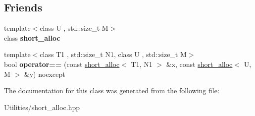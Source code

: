 \subsection*{Friends}
\begin{DoxyCompactItemize}
\item 
\hypertarget{classshort__alloc_ad683bc9e6e3661dbc2385e8fc3fb9f37}{{\footnotesize template$<$class U , std\+::size\+\_\+t M$>$ }\\class {\bfseries short\+\_\+alloc}}\label{classshort__alloc_ad683bc9e6e3661dbc2385e8fc3fb9f37}

\item 
\hypertarget{classshort__alloc_a9d23222731dd092dc2cb821782d30da0}{{\footnotesize template$<$class T1 , std\+::size\+\_\+t N1, class U , std\+::size\+\_\+t M$>$ }\\bool {\bfseries operator==} (const \hyperlink{classshort__alloc}{short\+\_\+alloc}$<$ T1, N1 $>$ \&x, const \hyperlink{classshort__alloc}{short\+\_\+alloc}$<$ U, M $>$ \&y) noexcept}\label{classshort__alloc_a9d23222731dd092dc2cb821782d30da0}

\end{DoxyCompactItemize}


The documentation for this class was generated from the following file\+:\begin{DoxyCompactItemize}
\item 
Utilities/short\+\_\+alloc.\+hpp\end{DoxyCompactItemize}
